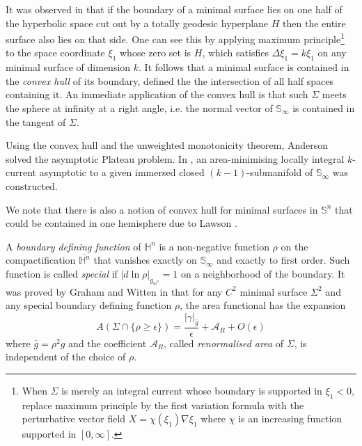 \documentclass[11pt]{article}
\begin{document}
It was observed in \cite{Anderson82_CompleteMinimalVarieties} that if the boundary of a
minimal surface lies on one half of the hyperbolic space cut out by a totally geodesic
hyperplane \(H\) then the entire surface also lies on that side. One can see this by
applying maximum principle\footnote{When \(\Sigma\) is merely an integral current whose boundary is supported in \(\xi_1 < 0\), replace maximum principle by the first variation formula with the perturbative vector field \(X =
\chi(\xi_1)\nabla\xi_1\) where \(\chi\) is an increasing function supported in \([0,\infty]\).} to the space coordinate \(\xi_1\) whose zero set is \(H\),
which satisfies \(\Delta \xi_1 = k \xi_1\) on any minimal surface of dimension \(k\). It follows that a
minimal surface is contained in the \emph{convex hull} of its boundary, defined the the
intersection of all half spaces containing it.
An immediate application of the convex hull is that such \(\Sigma\) meets the sphere at infinity
at a right angle, i.e. the normal vector of \(\mathbb{S}_\infty\) is
contained in the tangent of \(\Sigma\).

Using the convex hull and the unweighted monotonicity theorem, Anderson solved the
asymptotic Plateau problem.
In \cite{Anderson82_CompleteMinimalVarieties}, an area-minimising locally
integral \(k\)-current asymptotic to a given immersed closed \((k-1)\)-submanifold of
\(\mathbb{S}_\infty\) was constructed.

We note that there is also a notion of convex hull for  
minimal surfaces in \(\mathbb{S}^n\) that could be contained in one hemisphere due to
Lawson \cite{Lawson70_GlobalBehaviorMinimal}.

A \emph{boundary defining function} of \(\mathbb{H}^n\) is a non-negative function \(\rho\)
on the compactification \(\overline{\mathbb{H}^n}\) that vanishes exactly on \(\mathbb{S}_{\infty}\) and
exactly to first order. 
Such function is called \emph{special} if \(|d\ln\rho|_{g_{\mathbb{H}^n}} = 1\) on a neighborhood
of the boundary. It was proved by Graham and Witten in
\cite{Graham.Witten99_ConformalAnomalySubmanifold} that for any \(C^2\) minimal surface \(\Sigma^2\) and any special 
boundary defining function \(\rho\), the area functional has the expansion
\begin{equation}
\label{eq:GW-1}
 A(\Sigma\cap \{\rho \geq \epsilon\}) = \frac{|\gamma|_{\bar g}}{\epsilon} +
\mathcal{A}_R + O(\epsilon)
\end{equation}
where \(\bar g = \rho^2 g\) and the coefficient \(\mathcal{A}_R\), called \emph{renormalised
area} of \(\Sigma\), is independent of the choice of \(\rho\).
\end{document}
